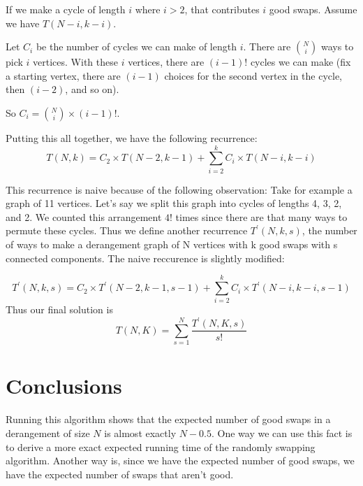 \documentclass[12pt]{article}
\begin{document}
If we make a cycle of length $i$ where $i > 2$, that contributes
$i$ good swaps. Assume we have $T(N - i, k - i)$.

Let $C_i$ be the number of cycles we can make of length $i$.
There are ${N \choose i}$ ways to pick $i$ vertices. With these $i$ vertices,
there are $(i-1)!$ cycles we can make (fix a starting vertex, there
are $(i - 1)$ choices for the second vertex in the cycle,
then $(i - 2)$, and so on). 

So $C_i = {N \choose i} \times (i - 1)!$.

Putting this all together, we have the following recurrence:
\[ T(N, k) =
C_2 \times T(N - 2, k - 1) +
\sum_{i = 2}^{k}{C_i \times T(N-i, k-i)} \]

This recurrence is naive because of the following observation:
Take for example a graph of 11 vertices. Let's say we split this
graph into cycles of lengths 4, 3, 2, and 2. We counted this
arrangement $4!$ times since there are that many ways to permute these
cycles. Thus we define another recurrence $T^\prime(N, k, s)$, the number
of ways to make a derangement graph of N vertices with k good swaps
with s connected components. The naive reccurence is slightly modified:

\[ T^\prime(N, k, s) =
C_2 \times T^\prime(N - 2, k - 1, s-1) +
\sum_{i = 2}^{k}{C_i \times T^\prime(N-i, k-i, s-1)} \]
Thus our final solution is
\[ T(N, K) = \sum_{s = 1}^{N}{\frac{T^\prime(N, K, s)}{s!}} \]

\section{Conclusions}\label{conclusions}
Running this algorithm shows that the expected number of good swaps
in a derangement of size $N$ is almost exactly $N - 0.5$.
One way we can use this fact is to derive a more exact expected running time of the
randomly swapping algorithm. Another way is, since we have the expected number of
good swaps, we have the expected number of swaps that aren't good.

% 
% 
\end{document}
